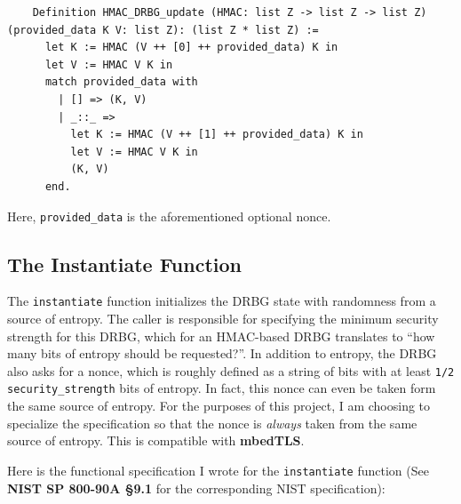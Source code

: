 \documentclass[pageno]{jpaper}
\newcommand{\stdtitle}[1]{\textbf{#1}}
\begin{document}
\begin{lstlisting}
    Definition HMAC_DRBG_update (HMAC: list Z -> list Z -> list Z) (provided_data K V: list Z): (list Z * list Z) :=
      let K := HMAC (V ++ [0] ++ provided_data) K in
      let V := HMAC V K in
      match provided_data with
        | [] => (K, V)
        | _::_ =>
          let K := HMAC (V ++ [1] ++ provided_data) K in
          let V := HMAC V K in
          (K, V)
      end.
\end{lstlisting}

Here, \lstinline{provided_data} is the aforementioned optional nonce.

\subsection{The Instantiate Function}

The \lstinline{instantiate} function initializes the DRBG state with randomness from a source of entropy. The caller is responsible for specifying the minimum security strength for this DRBG, which for an HMAC-based DRBG translates to “how many bits of entropy should be requested?”. In addition to entropy, the DRBG also asks for a nonce, which is roughly defined as a string of bits with at least \lstinline{1/2 security_strength} bits of entropy. In fact, this nonce can even be taken form the same source of entropy. For the purposes of this project, I am choosing to specialize the specification so that the nonce is \textit{always} taken from the same source of entropy. This is compatible with \stdtitle{mbedTLS}.

Here is the functional specification I wrote for the \lstinline{instantiate} function (See \stdtitle{NIST SP 800-90A \S 9.1} for the corresponding NIST specification):
\end{document}

